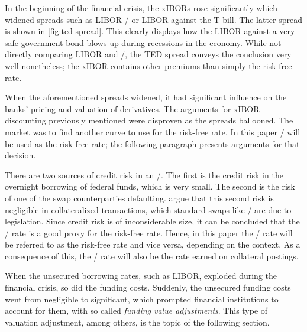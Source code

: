 \documentclass[main.tex]{subfiles}
\begin{document}
    In the beginning of the financial crisis, the xIBORs rose significantly
    which widened spreads such as LIBOR-\OIS/ or LIBOR against the T-bill.
    The latter spread is shown in \cref{fig:ted-spread}. This clearly 
    displays how the LIBOR against a very safe government bond blows up
    during recessions in the economy. 
    While not directly comparing LIBOR and \OIS/, 
    the TED spread conveys the conclusion very well nonetheless;
    the xIBOR contains other premiums than simply the risk-free rate.

    When the aforementioned spreads widened, 
    it had significant influence on the banks' pricing and valuation of derivatives.
    The arguments for xIBOR discounting previously mentioned
    were disproven as the spreads ballooned.
    The market was to find another curve to use for the risk-free rate.
    In this paper \OIS/ will be used as the risk-free rate;
    the following paragraph presents arguments for that decision.

    There are two sources of credit risk in an \OIS/.
    The first is the credit risk in the overnight borrowing of federal funds, which is very small. 
    The second is the risk of one of the swap counterparties defaulting.
    \textcite{HullWhiteOISvsLIBOR}
    argue that this second risk is negligible in collateralized transactions,
    which standard swaps like \OIS/ are due to legislation.
    Since credit risk is of inconsiderable size, it can be concluded 
    that the \OIS/ rate is a good proxy for the risk-free rate.
    Hence, in this paper the \OIS/ rate will be referred to as the risk-free rate
    and vice versa, depending on the context.
    As a consequence of this, the \OIS/ rate will also be the rate earned on collateral postings.

    When the unsecured borrowing rates, such as LIBOR, exploded during the financial crisis, 
    so did the funding costs. 
    Suddenly, the unsecured funding costs went from negligible to significant,
    which prompted financial institutions to account for them, 
    with so called \textit{funding value adjustments}. 
    This type of valuation adjustment, among others, is the topic of the following section.
\end{document}
